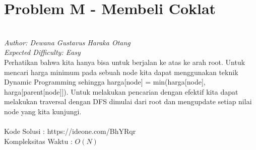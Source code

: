 \section*{Problem M - Membeli Coklat}
\\
\textit{Author: Dewana Gustavus Haraka Otang}
\\
\textit{Expected Difficulty: Easy}
\\

Perhatikan bahwa kita hanya bisa untuk berjalan ke atas ke arah root. Untuk mencari harga minimum pada sebuah node kita dapat menggunakan teknik Dynamic Programming sehingga harga[node] = min(harga[node], harga[parent[node]]). Untuk melakukan pencarian dengan efektif kita dapat melakukan traversal dengan DFS dimulai dari root dan mengupdate setiap nilai node yang kita kunjungi.\\
\\
Kode Solusi : https://ideone.com/BhYRqr
\\
Kompleksitas Waktu : $O(N)$
